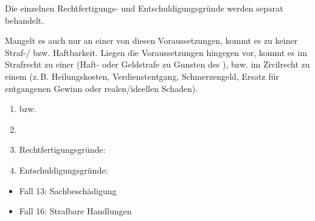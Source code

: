 {\begin{enumerate}
  Die einzelnen Rechtfertigungs- und Entschuldigungsgründe
  werden separat behandelt.
  
\end{enumerate}

Mangelt es auch nur an
einer von diesen Voraussetzungen, kommt es zu keiner
Straf-/ bzw. Haftbarkeit. Liegen die Voraussetzungen
hingegen vor, kommt es im Strafrecht zu einer 
(Haft- oder Geldstrafe zu Gunsten des ), bzw. 
im Zivilrecht zu einem  (z.\,B.
Heilungskosten, Verdienstentgang, Schmerzengeld, Ersatz für
entgangenen Gewinn oder realen/ideellen Schaden).

}{
\begin{enumerate}
  \item {} bzw. 
  \item {}
  \item {}

  Rechtfertigungsgründe:
  \item {}
  
  {Entschuldigungsgründe}:
\end{enumerate}
}
{}
{}
{}



{
\begin{itemize}
  \item Fall 13: Sachbeschädigung
  \dotfill{}
  \item Fall 16: Strafbare Handlungen
  \dotfill{}
\end{itemize}
}
{}
{}
{}
{}


\clearpage

